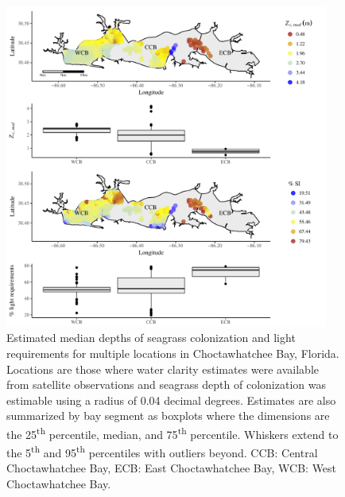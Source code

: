 \documentclass[letterpaper,12pt,oneside]{article}\usepackage[]{graphicx}\usepackage[]{color}
\begin{document}
\begin{figure}
\centering
\includegraphics[width = 0.95\textwidth]{figs/Fig7.pdf}
\caption{Estimated median depths of seagrass colonization and light requirements for multiple locations in Choctawhatchee Bay, Florida. Locations are those where water clarity estimates were available from satellite observations and seagrass depth of colonization was estimable using a radius of 0.04 decimal degrees.  Estimates are also summarized by bay segment as boxplots where the dimensions are the 25\textsuperscript{th} percentile, median, and 75\textsuperscript{th} percentile.  Whiskers extend to the 5\textsuperscript{th} and 95\textsuperscript{th} percentiles with outliers beyond. CCB: Central Choctawhatchee Bay, ECB: East Choctawhatchee Bay, WCB: West Choctawhatchee Bay.}
\label{fig:light_choc}
\end{figure}

\end{document}
